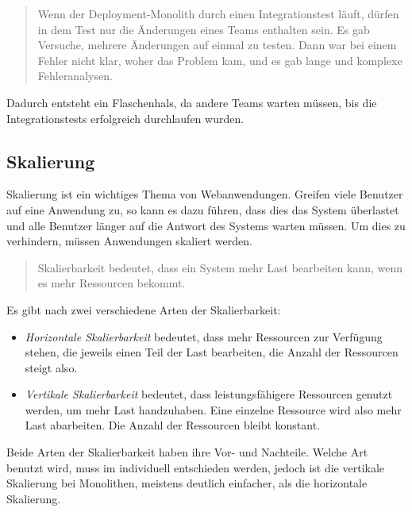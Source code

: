 \begin{quotation}
    \frqq Wenn der Deployment-Monolith durch einen Integrationstest läuft, dürfen in dem Test nur die Änderungen eines Teams enthalten sein. Es gab Versuche, mehrere Änderungen auf einmal zu testen. Dann war bei einem Fehler nicht klar, woher das Problem kam, und es gab lange und komplexe  Fehleranalysen.\flqq\ \cite[S. 16]{EWolff2016:Microservices}
\end{quotation}
Dadurch entsteht ein Flaschenhals, da andere Teams warten müssen, bis die Integrationstests erfolgreich durchlaufen wurden.


\subsection{Skalierung}
\label{subsec:SkalierungMonolithisch}
Skalierung ist ein wichtiges Thema von Webanwendungen. Greifen viele Benutzer auf eine Anwendung zu, so kann es dazu führen, dass dies das System überlastet und alle Benutzer länger auf die Antwort des Systems warten müssen. Um dies zu verhindern, müssen Anwendungen skaliert werden.

\begin{quotation}
    \frqq Skalierbarkeit bedeutet, dass ein System mehr Last bearbeiten kann, wenn es mehr Ressourcen bekommt.\flqq\ \cite[S. 150]{EWolff2016:Microservices}
\end{quotation}

Es gibt nach \cite[S. 150]{EWolff2016:Microservices} zwei verschiedene Arten der Skalierbarkeit:
\begin{itemize}
    \item \textit{Horizontale Skalierbarkeit} bedeutet, dass mehr Ressourcen zur Verfügung stehen, die jeweils einen Teil der Last bearbeiten, die Anzahl der Ressourcen steigt also.
    \item \textit{Vertikale Skalierbarkeit} bedeutet, dass leistungsfähigere Ressourcen genutzt werden, um mehr Last handzuhaben. Eine einzelne Ressource wird also mehr Last abarbeiten. Die Anzahl der Ressourcen bleibt konstant.
\end{itemize}

Beide Arten der Skalierbarkeit haben ihre Vor- und Nachteile. Welche Art benutzt wird, muss im individuell entschieden werden, jedoch ist die vertikale Skalierung bei Monolithen, meistens deutlich einfacher, als die horizontale Skalierung.